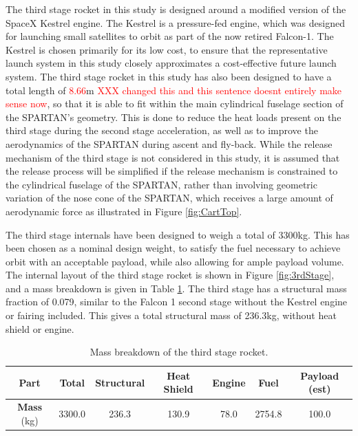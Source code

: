   The third stage rocket in this study is designed around a modified version of the SpaceX Kestrel engine. The Kestrel is a pressure-fed engine, which was designed for launching small satellites to orbit as part of the now retired Falcon-1. The Kestrel is chosen primarily for its low cost, to ensure that the representative launch system in this study closely approximates a cost-effective future launch system.  
  The third stage rocket in this study has also been designed to have a total length of \textcolor{red}{8.66}m \textcolor{red}{XXX changed this and this sentence doesnt entirely make sense now}, so that it is able to fit within the main cylindrical fuselage section of the SPARTAN's geometry.  This is done to reduce the heat loads present on the third stage during the second stage acceleration, as well as to improve the aerodynamics of the SPARTAN during ascent and fly-back. While the release mechanism of the third stage is not considered in this study, it is assumed that the release process will be simplified if the release mechanism is constrained to the cylindrical fuselage of the SPARTAN, rather than involving geometric variation of the nose cone of the SPARTAN, which receives a large amount of aerodynamic force as illustrated in Figure \ref{fig:CartTop}.
  
 The third stage internals have been designed to weigh a total of 3300kg. This has been chosen as a nominal design weight, to satisfy the fuel necessary to achieve orbit with an acceptable payload, while also allowing for ample payload volume. The internal layout of the third stage rocket is shown in Figure \ref{fig:3rdStage}, and a mass breakdown is given in Table \ref{tab:MassBreakdown3}. The third stage has a structural mass fraction of 0.079, similar to the Falcon 1 second stage without the Kestrel engine or fairing included\cite{Vehicle2008}. This gives a total structural mass of 236.3kg, without heat shield or engine. 
 

 
	\begin{table}[h]
		\centering
		\begin{tabular}{|c|c|c|c|c|c|c|}
			\hline  \textbf{Part} & Total & Structural & Heat Shield & Engine & Fuel & Payload (est) \\ 
			\hline \textbf{Mass} (kg) & 3300.0  & 236.3  & 130.9  & 78.0  & 2754.8 & 100.0\\ 
			\hline 
		\end{tabular} 
		\caption{Mass breakdown of the third stage rocket.}
		\label{tab:MassBreakdown3}
	\end{table}
 
